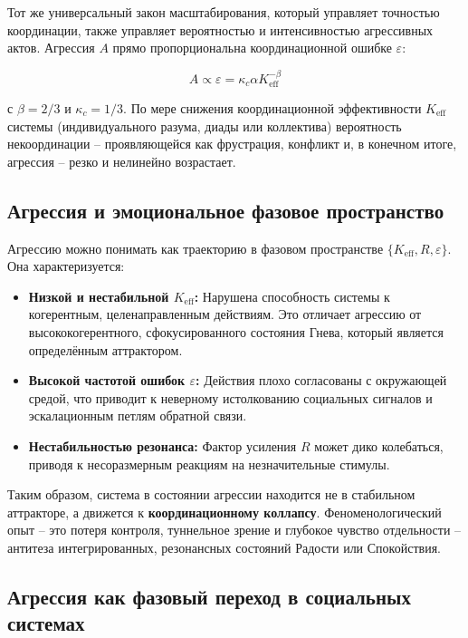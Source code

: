 \documentclass[12pt,a4paper]{article}
\begin{document}
	Тот же универсальный закон масштабирования, который управляет точностью координации, также управляет вероятностью и интенсивностью агрессивных актов. Агрессия \(A\) прямо пропорциональна координационной ошибке \(\varepsilon\):
	
	\begin{equation}
		A \propto \varepsilon = \kappa_c \alpha K_{\mathrm{eff}}^{-\beta}
	\end{equation}
	
	с \(\beta = 2/3\) и \(\kappa_c = 1/3\). По мере снижения координационной эффективности \(K_{\mathrm{eff}}\) системы (индивидуального разума, диады или коллектива) вероятность некоординации – проявляющейся как фрустрация, конфликт и, в конечном итоге, агрессия – резко и нелинейно возрастает.
	
	\subsection{Агрессия и эмоциональное фазовое пространство}
	
	Агрессию можно понимать как траекторию в фазовом пространстве \(\{K_{\mathrm{eff}}, R, \varepsilon\}\). Она характеризуется:
	
	\begin{itemize}
		\item \textbf{Низкой и нестабильной \(K_{\mathrm{eff}}\):} Нарушена способность системы к когерентным, целенаправленным действиям. Это отличает агрессию от высококогерентного, сфокусированного состояния Гнева, который является определённым аттрактором.
		\item \textbf{Высокой частотой ошибок \(\varepsilon\):} Действия плохо согласованы с окружающей средой, что приводит к неверному истолкованию социальных сигналов и эскалационным петлям обратной связи.
		\item \textbf{Нестабильностью резонанса:} Фактор усиления \(R\) может дико колебаться, приводя к несоразмерным реакциям на незначительные стимулы.
	\end{itemize}
	
	Таким образом, система в состоянии агрессии находится не в стабильном аттракторе, а движется к \textbf{координационному коллапсу}. Феноменологический опыт – это потеря контроля, туннельное зрение и глубокое чувство отдельности – антитеза интегрированных, резонансных состояний Радости или Спокойствия.
	
	\subsection{Агрессия как фазовый переход в социальных системах}
	
\end{document}
